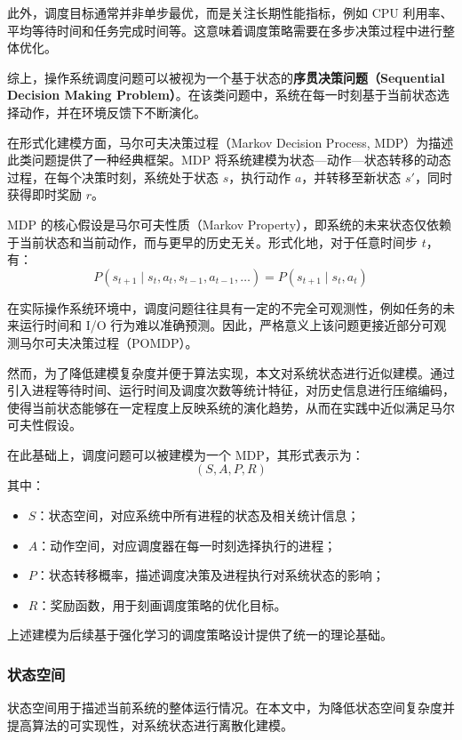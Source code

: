 此外，调度目标通常并非单步最优，而是关注长期性能指标，例如 CPU 利用率、平均等待时间和任务完成时间等。这意味着调度策略需要在多步决策过程中进行整体优化。

综上，操作系统调度问题可以被视为一个基于状态的\textbf{序贯决策问题（Sequential Decision Making Problem）}。在该类问题中，系统在每一时刻基于当前状态选择动作，并在环境反馈下不断演化。

在形式化建模方面，马尔可夫决策过程（Markov Decision Process, MDP）为描述此类问题提供了一种经典框架。MDP 将系统建模为状态—动作—状态转移的动态过程，在每个决策时刻，系统处于状态 $s$，执行动作 $a$，并转移至新状态 $s'$，同时获得即时奖励 $r$。

MDP 的核心假设是马尔可夫性质（Markov Property），即系统的未来状态仅依赖于当前状态和当前动作，而与更早的历史无关。形式化地，对于任意时间步 $t$，有：
\begin{equation}
P(s_{t+1} \mid s_t, a_t, s_{t-1}, a_{t-1}, \dots)
= P(s_{t+1} \mid s_t, a_t)
\end{equation}

在实际操作系统环境中，调度问题往往具有一定的不完全可观测性，例如任务的未来运行时间和 I/O 行为难以准确预测。因此，严格意义上该问题更接近部分可观测马尔可夫决策过程（POMDP）。

然而，为了降低建模复杂度并便于算法实现，本文对系统状态进行近似建模。通过引入进程等待时间、运行时间及调度次数等统计特征，对历史信息进行压缩编码，使得当前状态能够在一定程度上反映系统的演化趋势，从而在实践中近似满足马尔可夫性假设。

在此基础上，调度问题可以被建模为一个 MDP，其形式表示为：
$$
(S, A, P, R)
$$
其中：
\begin{itemize}
    \item $S$：状态空间，对应系统中所有进程的状态及相关统计信息；
    \item $A$：动作空间，对应调度器在每一时刻选择执行的进程；
    \item $P$：状态转移概率，描述调度决策及进程执行对系统状态的影响；
    \item $R$：奖励函数，用于刻画调度策略的优化目标。
\end{itemize}

上述建模为后续基于强化学习的调度策略设计提供了统一的理论基础。
\subsubsection{状态空间}

状态空间用于描述当前系统的整体运行情况。在本文中，为降低状态空间复杂度并提高算法的可实现性，对系统状态进行离散化建模。


